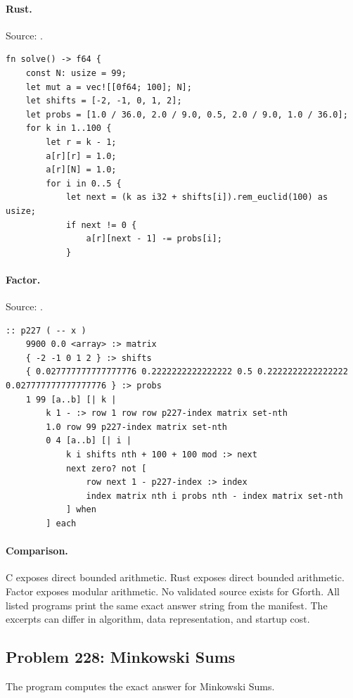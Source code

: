 \paragraph{Rust.} Source: .
\begin{lstlisting}
fn solve() -> f64 {
    const N: usize = 99;
    let mut a = vec![[0f64; 100]; N];
    let shifts = [-2, -1, 0, 1, 2];
    let probs = [1.0 / 36.0, 2.0 / 9.0, 0.5, 2.0 / 9.0, 1.0 / 36.0];
    for k in 1..100 {
        let r = k - 1;
        a[r][r] = 1.0;
        a[r][N] = 1.0;
        for i in 0..5 {
            let next = (k as i32 + shifts[i]).rem_euclid(100) as usize;
            if next != 0 {
                a[r][next - 1] -= probs[i];
            }
\end{lstlisting}

\paragraph{Factor.} Source: .
\begin{lstlisting}
:: p227 ( -- x )
    9900 0.0 <array> :> matrix
    { -2 -1 0 1 2 } :> shifts
    { 0.027777777777777776 0.2222222222222222 0.5 0.2222222222222222 0.027777777777777776 } :> probs
    1 99 [a..b] [| k |
        k 1 - :> row 1 row row p227-index matrix set-nth
        1.0 row 99 p227-index matrix set-nth
        0 4 [a..b] [| i |
            k i shifts nth + 100 + 100 mod :> next
            next zero? not [
                row next 1 - p227-index :> index
                index matrix nth i probs nth - index matrix set-nth
            ] when
        ] each
\end{lstlisting}

\paragraph{Comparison.}
C exposes direct bounded arithmetic. Rust exposes direct bounded arithmetic. Factor exposes modular arithmetic.
No validated source exists for Gforth.
All listed programs print the same exact answer string from the manifest. The excerpts can differ in algorithm, data representation, and startup cost.

\subsection{Problem 228: Minkowski Sums}
\label{walkthrough:p228}
The program computes the exact answer for Minkowski Sums.

